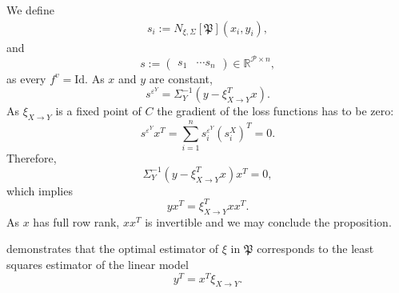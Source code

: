 \documentclass[a4paper,11pt]{report}
\begin{document}
\begin{Bew}
We define
\begin{align*}
s_i:=N_{\xi,\Sigma}[\mathfrak{P}](x_i,y_i),
\end{align*}
and 
\[
s:=\begin{pmatrix}
s_1&\dotsb s_n
\end{pmatrix}\in
\mathbb{R}^{\mathcal{P}\times n},
\]
as every $f^v=\text{Id}$. As $x$ and $y$ are constant, 
\[
s^{\varepsilon^Y}=\Sigma_Y^{-1}(y-\xi_{X\to Y}^Tx).
\]
As $\xi_{X\to Y}$ is a fixed point of $C$ the gradient of the loss functions has to be zero:
\[
s^{\varepsilon^Y}x^T=\sum_{i=1}^ns_i^{\varepsilon^Y}\left(s_i^{X}\right)^T=0.
\]
Therefore,
\[
\Sigma_Y^{-1}(y-\xi_{X\to Y}^Tx)x^T=0,
\]
which implies
\[
yx^T=\xi_{X\to Y}^Txx^T.
\]
As $x$ has full row rank, $xx^T$ is invertible and we may conclude the proposition.
\end{Bew}

\begin{Par}
 demonstrates that the optimal estimator of $\xi$ in $\mathfrak{P}$ corresponds to the least squares estimator of the linear model
\[
y^T=x^T\xi_{X\to Y}.
\]
\end{Par}
\end{document}
